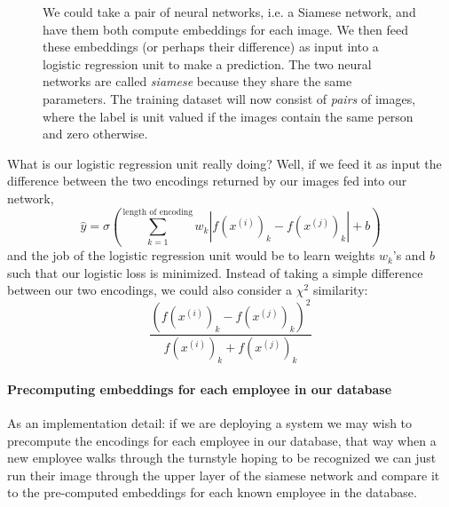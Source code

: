 \documentclass[12pt]{article}
\begin{document}
\begin{figure}[h]
  \caption{\footnotesize We could take a pair of neural networks, i.e. a Siamese network, and have them both compute embeddings for each image. We then feed these embeddings (or perhaps their difference) as input into a logistic regression unit to make a prediction. The two neural networks are called \emph{siamese} because they share the same parameters. The training dataset will now consist of \emph{pairs} of images, where the label is unit valued if the images contain the same person and zero otherwise.}
\end{figure}
What is our logistic regression unit really doing? Well, if we feed it as input the difference between the two encodings returned by our images fed into our network,
\[
\hat y = \sigma \left( \sum_{k=1}^{\textrm{length of encoding}} w_k |f(x^{(i)})_k - f(x^{(j)})_k| + b\right)
\]
and the job of the logistic regression unit would be to learn weights $w_k$'s and $b$ such that our logistic loss is minimized.
Instead of taking a simple difference between our two encodings, we could also consider a $\chi^2$ similarity:
\[
\frac{\left(f(x^{(i)})_k - f(x^{(j)})_k\right)^2}{f(x^{(i)})_k + f(x^{(j)})_k}
\]

\paragraph{Precomputing embeddings for each employee in our database}
As an implementation detail: if we are deploying a system we may wish to precompute the encodings for each employee in our database, that way when a new employee walks through the turnstyle hoping to be recognized we can just run their image through the upper layer of the siamese network and compare it to the pre-computed embeddings for each known employee in the database.
\end{document}
